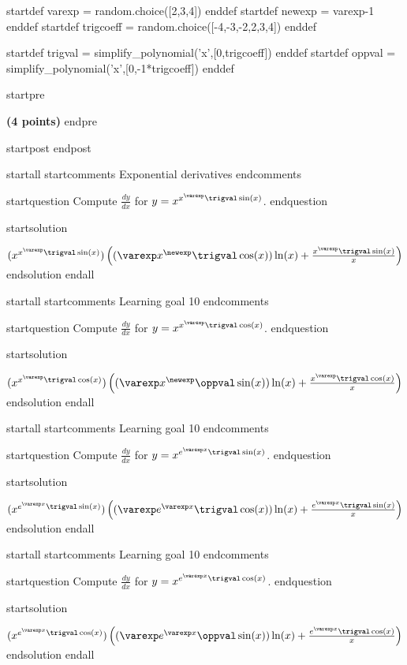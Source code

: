 startdef varexp = random.choice([2,3,4]) enddef
startdef newexp = varexp-1 enddef
startdef trigcoeff = random.choice([-4,-3,-2,2,3,4]) enddef

startdef trigval = simplify_polynomial('x',[0,trigcoeff]) enddef
startdef oppval = simplify_polynomial('x',[0,-1*trigcoeff]) enddef


startpre
\item {\bf (4 points)} 
endpre

startpost
\vfill 
endpost



startall
startcomments 
Exponential derivatives
endcomments

startquestion Compute $\frac{dy}{dx}$ for $y=x^{x^\varexp \trigval \sin(x)}$.
endquestion

startsolution
\item $(x^{x^\varexp \trigval \sin(x)}) \left( (\varexp x^{\newexp} \trigval \cos(x))\ln(x) + \frac{x^\varexp \trigval \sin(x)}{x} \right)$
endsolution
endall




startall
startcomments 
Learning goal 10
endcomments

startquestion Compute $\frac{dy}{dx}$ for $y=x^{x^\varexp \trigval \cos(x)}$.
endquestion

startsolution
\item $(x^{x^\varexp \trigval \cos(x)}) \left( (\varexp x^{\newexp} \oppval \sin(x))\ln(x) + \frac{x^\varexp \trigval \cos(x)}{x} \right)$
endsolution
endall




startall
startcomments 
Learning goal 10
endcomments

startquestion Compute $\frac{dy}{dx}$ for $y=x^{e^{\varexp x} \trigval \sin(x)}$.
endquestion

startsolution
\item $(x^{e^{\varexp x} \trigval \sin(x)}) \left( (\varexp e^{\varexp x} \trigval \cos(x))\ln(x) + \frac{e^{\varexp x} \trigval \sin(x)}{x} \right)$
endsolution
endall



startall
startcomments 
Learning goal 10
endcomments

startquestion Compute $\frac{dy}{dx}$ for $y=x^{e^{\varexp x} \trigval \cos(x)}$.
endquestion

startsolution
\item $(x^{e^{\varexp x} \trigval \cos(x)}) \left( (\varexp e^{\varexp x} \oppval \sin(x))\ln(x) + \frac{e^{\varexp x} \trigval \cos(x)}{x} \right)$
endsolution
endall



